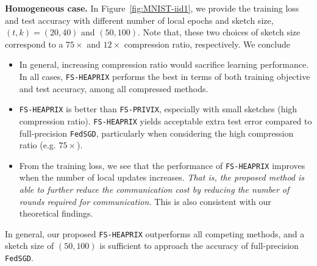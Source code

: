 \documentclass{article}
\begin{document}
\textbf{Homogeneous case.} In Figure~\ref{fig:MNIST-iid1}, we provide the training loss and test accuracy with different number of local epochs and sketch size, $(t,k)=(20,40)$ and $(50,100)$. 
Note that, these two choices of sketch size correspond to a $75\times$ and $12\times$ compression ratio, respectively. We conclude
\begin{itemize}
    \item In general, increasing compression ratio would sacrifice learning performance. In all cases, \texttt{FS-HEAPRIX} performs the best in terms of both training objective and test accuracy, among all compressed methods.
    
    \item \texttt{FS-HEAPRIX} is better than \texttt{FS-PRIVIX}, especially with small sketches (high compression ratio). \texttt{FS-HEAPRIX} yields acceptable extra test error compared to full-precision \texttt{FedSGD}, particularly when considering the high compression ratio (e.g. $75\times$). 
    
    \item From the training loss, we see that the performance of \texttt{FS-HEAPRIX} improves when the number of local updates increases. \emph{That is, the proposed method is able to further reduce the communication cost by reducing the number of rounds required for communication.} This is also consistent with our theoretical findings. 
\end{itemize}
In general, our proposed \texttt{FS-HEAPRIX} outperforms all competing methods, and a sketch size of $(50,100)$ is sufficient to approach the accuracy of full-precision \texttt{FedSGD}.
\end{document}
